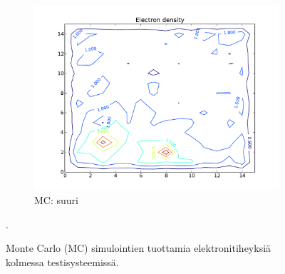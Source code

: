 \documentclass{article}
\begin{document}
\begin{figure}
        ~ %
        \begin{subfigure}[b]{0.3\textwidth}
                \includegraphics[width=\textwidth]{mc_suuri.pdf}
                \caption{MC: suuri}
                \label{fig:mouse}
        \end{subfigure}
        \caption{Monte Carlo (MC) simulointien tuottamia elektronitiheyksiä kolmessa testisysteemissä.}\label{fig:animals}
        \label{fig:mc-simulaatiot}.
\end{figure}
\end{document}
